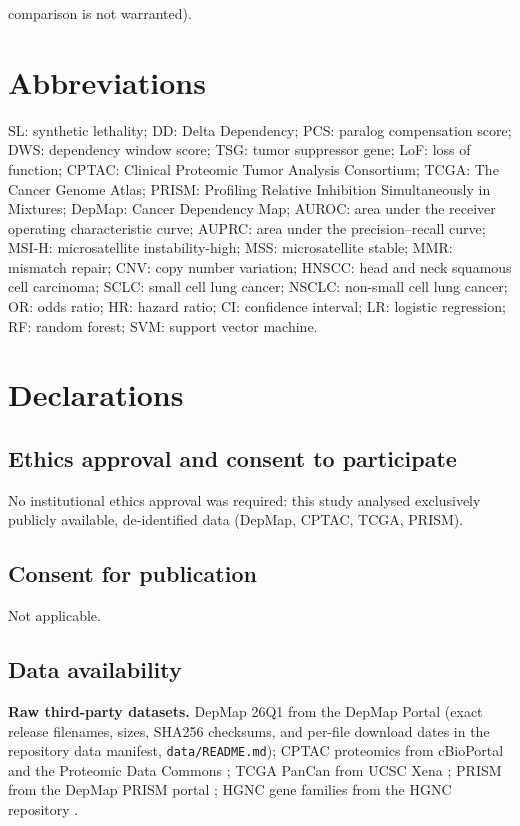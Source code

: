 \documentclass[11pt,a4paper]{article}
\begin{document}
comparison is not warranted).


\section*{Abbreviations}
\noindent
SL: synthetic lethality;
DD: Delta Dependency;
PCS: paralog compensation score;
DWS: dependency window score;
TSG: tumor suppressor gene;
LoF: loss of function;
CPTAC: Clinical Proteomic Tumor Analysis Consortium;
TCGA: The Cancer Genome Atlas;
PRISM: Profiling Relative Inhibition Simultaneously in Mixtures;
DepMap: Cancer Dependency Map;
AUROC: area under the receiver operating characteristic curve;
AUPRC: area under the precision--recall curve;
MSI-H: microsatellite instability-high;
MSS: microsatellite stable;
MMR: mismatch repair;
CNV: copy number variation;
HNSCC: head and neck squamous cell carcinoma;
SCLC: small cell lung cancer;
NSCLC: non-small cell lung cancer;
OR: odds ratio;
HR: hazard ratio;
CI: confidence interval;
LR: logistic regression;
RF: random forest;
SVM: support vector machine.

\section*{Declarations}

\subsection*{Ethics approval and consent to participate}
No institutional ethics approval was required: this study analysed exclusively publicly available, de-identified data (DepMap, CPTAC, TCGA, PRISM).

\subsection*{Consent for publication}
Not applicable.

\subsection*{Data availability}
\noindent\textbf{Raw third-party datasets.} DepMap 26Q1 from the DepMap Portal \cite{DepMap2026} (exact release filenames, sizes, SHA256 checksums, and per-file download dates in the repository data manifest, \texttt{data/README.md}); CPTAC proteomics from cBioPortal \cite{Cerami2012,Gao2013} and the Proteomic Data Commons \cite{PDC}; TCGA PanCan from UCSC Xena \cite{Goldman2020}; PRISM from the DepMap PRISM portal \cite{Corsello2020}; HGNC gene families from the HGNC repository \cite{HGNC}.
\end{document}
